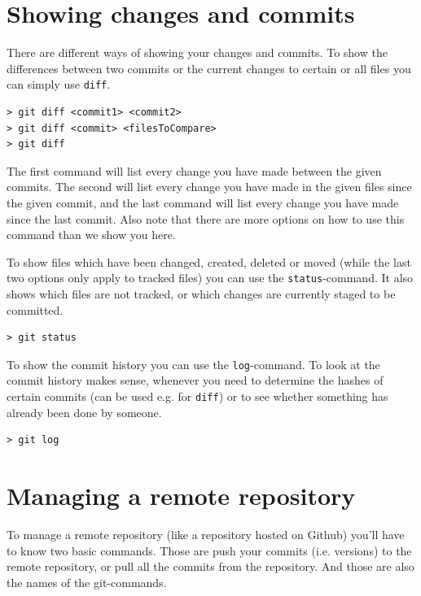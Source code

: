 \documentclass[a4paper, 12pt]{article}
\begin{document}
	\section{Showing changes and commits}
		
		There are different ways of showing your changes and commits. To show the differences between two commits or the current changes to certain or all files you can simply use \lstinline|diff|.
		
		\begin{lstlisting}
> git diff <commit1> <commit2>
> git diff <commit> <filesToCompare>
> git diff
		\end{lstlisting}
		
		The first command will list every change you have made between the given commits. The second will list every change you have made in the given files since the given commit, and the last command will list every change you have made since the last commit. Also note that there are more options on how to use this command than we show you here.
		\newpage
		
		To show files which have been changed, created, deleted or moved (while the last two options only apply to tracked files) you can use the \lstinline|status|-command. It also shows which files are not tracked, or which changes are currently staged to be committed.
		
		\begin{lstlisting}
> git status
		\end{lstlisting}
		
		To show the commit history you can use the \lstinline|log|-command. To look at the commit history makes sense, whenever you need to determine the hashes of certain commits (can be used e.g. for \lstinline|diff|) or to see whether something has already been done by someone.
		
		\begin{lstlisting}
> git log
		\end{lstlisting}
		
	\section{Managing a remote repository}
	
		To manage a remote repository (like a repository hosted on Github) you'll have to know two basic commands. Those are push your commits (i.e. versions) to the remote repository, or pull all the commits from the repository. And those are also the names of the git-commands.
		
\end{document}
